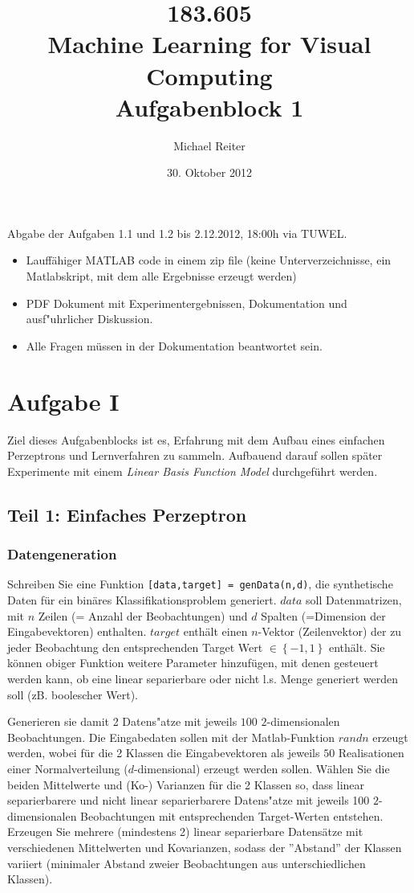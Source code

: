 \documentclass[a4]{article}
\title{\bf 183.605 \\ Machine Learning for Visual Computing \\ Aufgabenblock 1}
\author{Michael Reiter}
\date{30. Oktober 2012}
\begin{document}
\noindent

\maketitle

\noindent
Abgabe der Aufgaben 1.1 und 1.2 bis 2.12.2012, 18:00h via TUWEL. \\
\begin{itemize}
\item Lauffähiger MATLAB code in einem zip file (keine Unterverzeichnisse, ein Matlabskript, mit dem alle Ergebnisse erzeugt werden)
\item PDF Dokument mit Experimentergebnissen, Dokumentation und
ausf"uhrlicher Diskussion.
\item Alle Fragen müssen in der Dokumentation beantwortet sein.
\end{itemize}

\section{Aufgabe I}
Ziel dieses Aufgabenblocks ist es, Erfahrung mit dem Aufbau eines einfachen Perzeptrons und Lernverfahren zu sammeln. Aufbauend darauf sollen später Experimente mit einem \emph{Linear Basis Function Model} durchgeführt werden.

\subsection{Teil 1: Einfaches Perzeptron}

\subsubsection{Datengeneration}\label{sec:datageneration}
Schreiben Sie eine Funktion \texttt{[data,target] = genData(n,d)}, die synthetische Daten für ein binäres Klassifikationsproblem generiert. $data$ soll Datenmatrizen, mit $n$ Zeilen (= Anzahl der Beobachtungen) und  $d$ Spalten (=Dimension der Eingabevektoren) enthalten. $target$ enthält einen $n$-Vektor (Zeilenvektor) der zu jeder Beobachtung den entsprechenden Target Wert $\in \left\{-1,1\right\}$ enthält. Sie können obiger Funktion weitere Parameter hinzufügen, mit denen gesteuert werden kann, ob eine linear separierbare oder nicht l.s. Menge generiert werden soll (zB. boolescher Wert).

Generieren sie damit 2 Datens"atze
mit jeweils $100$ $2$-dimensionalen Beobachtungen. Die Eingabedaten sollen mit der Matlab-Funktion $randn$ erzeugt werden, wobei für die 2 Klassen die Eingabevektoren als jeweils $50$ Realisationen einer Normalverteilung ($d$-dimensional) erzeugt werden sollen. Wählen Sie die beiden Mittelwerte und (Ko-) Varianzen für die 2 Klassen so, dass linear separierbarere und nicht linear separierbarere Datens"atze mit jeweils 100 $2$-dimensionalen Beobachtungen mit entsprechenden Target-Werten entstehen. Erzeugen Sie mehrere (mindestens 2) linear separierbare Datensätze mit verschiedenen Mittelwerten und Kovarianzen, sodass der ''Abstand'' der Klassen variiert (minimaler Abstand zweier Beobachtungen aus unterschiedlichen Klassen).
\end{document}
